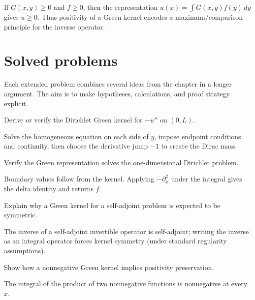 \begin{example}\label{ex:iii25-worked-04}
If \(G(x,y)\ge0\) and \(f\ge0\), then the representation
\(u(x)=\int G(x,y)f(y)\,dy\) gives \(u\ge0\). Thus positivity of a Green kernel
encodes a maximum/comparison principle for the inverse operator.
\end{example}

\section{Solved problems}
Each extended problem combines several ideas from the chapter in a longer argument. The aim is to make hypotheses, calculations, and proof strategy explicit.

\begin{problem}\label{prob:iii25-problem-01}
Derive or verify the Dirichlet Green kernel for \(-u''\) on \((0,L)\).
\end{problem}
\begin{solution}
Solve the homogeneous equation on each side of \(y\), impose endpoint
conditions and continuity, then choose the derivative jump \(-1\) to create
the Dirac mass.
\end{solution}

\begin{problem}\label{prob:iii25-problem-02}
Verify the Green representation solves the one-dimensional Dirichlet problem.
\end{problem}
\begin{solution}
Boundary values follow from the kernel. Applying
\(-\partial_x^2\) under the integral gives the delta identity and returns
\(f\).
\end{solution}

\begin{problem}\label{prob:iii25-problem-03}
Explain why a Green kernel for a self-adjoint problem is expected to be symmetric.
\end{problem}
\begin{solution}
The inverse of a self-adjoint invertible operator is self-adjoint; writing
the inverse as an integral operator forces kernel symmetry (under standard
regularity assumptions).
\end{solution}

\begin{problem}\label{prob:iii25-problem-04}
Show how a nonnegative Green kernel implies positivity preservation.
\end{problem}
\begin{solution}
The integral of the product of two nonnegative functions is nonnegative at
every \(x\).
\end{solution}

